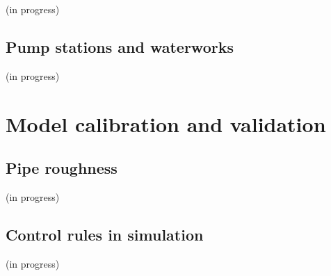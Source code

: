 (in progress)

\subsection{Pump stations and waterworks}
\label{pump_stations_andwaterworks}

(in progress)

\section{Model calibration and validation}
\label{model_calibration_and_validation}

\subsection{Pipe roughness}
\label{pipe_roughness}

(in progress)

\subsection{Control rules in simulation}
\label{control rules in simulation}

(in progress)

























